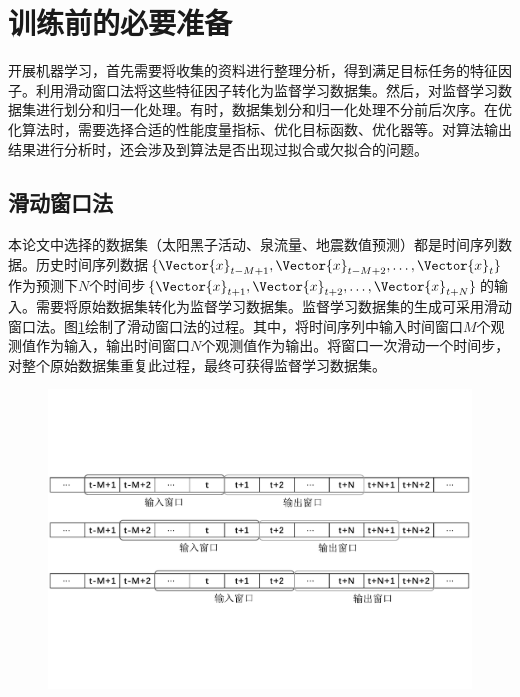 \section{训练前的必要准备}\label{sec:ml_prepare}

开展机器学习，首先需要将收集的资料进行整理分析，得到满足目标任务的特征因子。利用滑动窗口法将这些特征因子转化为监督学习数据集。然后，对监督学习数据集进行划分和归一化处理。有时，数据集划分和归一化处理不分前后次序。在优化算法时，需要选择合适的性能度量指标、优化目标函数、优化器等。对算法输出结果进行分析时，还会涉及到算法是否出现过拟合或欠拟合的问题。

\subsection{滑动窗口法}\label{sec:ml_slide}

本论文中选择的数据集（太阳黑子活动、泉流量、地震数值预测）都是时间序列数据。历史时间序列数据$\{\Vector{x}_{t-M+1},\Vector{x}_{t-M+2},\ldots,\Vector{x}_{t}\}$作为预测下$N$个时间步$\{\Vector{x}_{t+1},\Vector{x}_{t+2},\ldots,\Vector{x}_{t+N}\}$的输入。需要将原始数据集转化为监督学习数据集。监督学习数据集的生成可采用滑动窗口法。图\ref{fig:slide_window}绘制了滑动窗口法的过程。其中，将时间序列中输入时间窗口$M$个观测值作为输入，输出时间窗口$N$个观测值作为输出。将窗口一次滑动一个时间步，对整个原始数据集重复此过程，最终可获得监督学习数据集。

\begin{figure}[!htbp]
  \centering
  \includegraphics[width=\textwidth]{Img/chap2_ml/slide_window.pdf}
  \label{fig:slide_window}
\end{figure}

